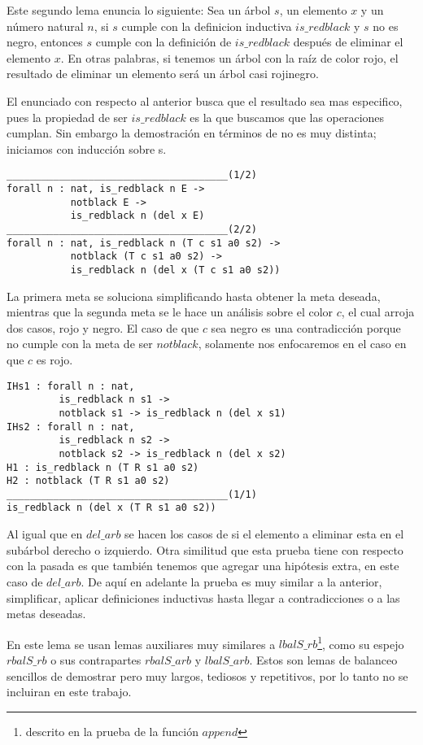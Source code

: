 Este segundo lema enuncia lo siguiente: Sea un \'arbol $s$, un elemento $x$ y un n\'umero natural
$n$, si $s$ cumple con la definicion inductiva $is\_redblack$ y $s$ no es negro, entonces $s$
cumple con la definición de $is\_redblack$ después de eliminar el elemento $x$. En otras palabras,
si tenemos un \'arbol con la raíz de color rojo, el resultado de eliminar un elemento ser\'a un
\'arbol casi rojinegro.

El enunciado con respecto al anterior busca que el resultado sea mas especifico, pues la propiedad
de ser $is\_redblack$ es la que buscamos que las operaciones cumplan. Sin embargo la demostraci\'on
en términos de {\coq} no es muy distinta; iniciamos con inducci\'on sobre s.

\begin{verbatim}
______________________________________(1/2)
forall n : nat, is_redblack n E ->
           notblack E ->
           is_redblack n (del x E)
______________________________________(2/2)
forall n : nat, is_redblack n (T c s1 a0 s2) ->
           notblack (T c s1 a0 s2) ->
           is_redblack n (del x (T c s1 a0 s2))
\end{verbatim}

La primera meta se soluciona simplificando hasta obtener la meta deseada, mientras que la segunda
meta se le hace un análisis sobre el color $c$, el cual arroja dos casos, rojo y negro. El caso de
que $c$ sea negro es una contradicci\'on porque no cumple con la meta de ser $notblack$, solamente
nos enfocaremos en el caso en que $c$ es rojo.

\begin{verbatim}
IHs1 : forall n : nat,
         is_redblack n s1 ->
         notblack s1 -> is_redblack n (del x s1)
IHs2 : forall n : nat,
         is_redblack n s2 ->
         notblack s2 -> is_redblack n (del x s2)
H1 : is_redblack n (T R s1 a0 s2)
H2 : notblack (T R s1 a0 s2)
______________________________________(1/1)
is_redblack n (del x (T R s1 a0 s2))
\end{verbatim}

Al igual que en $del\_arb$ se hacen los casos de si el elemento a eliminar esta en el subárbol
derecho o izquierdo. Otra similitud que esta prueba tiene con respecto con la pasada es que también
tenemos que agregar una hipótesis extra, en este caso de $del\_arb$. De aquí en adelante la prueba
es muy similar a la anterior, simplificar, aplicar definiciones inductivas hasta llegar a
contradicciones o a las metas deseadas.

En este lema se usan lemas auxiliares muy similares a $lbalS\_rb$\footnote{descrito en la prueba de
la  funci\'on $append$}, como su espejo $rbalS\_rb$ o sus contrapartes $rbalS\_arb$ y $lbalS\_arb$.
Estos son lemas de balanceo sencillos de demostrar pero muy largos, tediosos y repetitivos, por lo
tanto no se incluiran en este trabajo.

